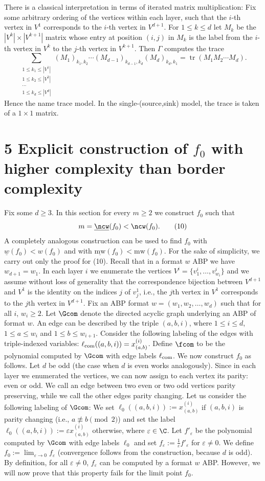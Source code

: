 There is a classical interpretation in terms of iterated matrix multiplication: Fix some arbitrary ordering of the vertices within each layer, such that the $i$-th vertex in $V^1$ corresponds to the $i$-th vertex in $V^{d+1}$. For $1\le k\le d$ let $M_k$ be the $|V^k|\times|V^{k+1}|$ matrix whose entry at position $(i,j)$ in $M_k$ is the label from the $i$-th vertex in $V^k$ to the $j$-th vertex in $V^{k+1}$. Then $\Gamma$ computes the trace
\[\sum_{\substack{1\le k_1\le|V^1|\\1\le k_2\le|V^2|\\\cdots\\1\le k_d\le|V^d|}}(M_1)_{k_1,k_2}\cdots(M_{d-1})_{k_{d-1},k_d}(M_d)_{k_d,k_1}=\operatorname{tr}(M_1M_2\cdots M_d).\tag{8}\]
Hence the name trace model. In the single-(source,sink) model, the trace is taken of a $1\times1$ matrix.
\section*{5 Explicit construction of $f_0$ with higher complexity than border complexity}
Fix some $d\ge3$. In this section for every $m\ge2$ we construct $f_0$ such that
\[m=\underline{\ncw}(f_0)<\ncw(f_0).\tag{10}\]
A completely analogous construction can be used to find $f_0$ with $\underline w(f_0)<w(f_0)$ and with $\underline{\mathrm{mw}}(f_0)<\mathrm{mw}(f_0)$. For the sake of simplicity, we carry out only the proof for (10).
Recall that in a format $w$ ABP we have $w_{d+1}=w_1$. In each layer $i$ we enumerate the vertices $V^i=\{v^i_1,\ldots,v^i_{w_i}\}$ and we assume without loss of generality that the correspondence bijection between $V^{d+1}$ and $V^1$ is the identity on the indices $j$ of $v^1_j$, i.e., the $j$th vertex in $V^1$ corresponds to the $j$th vertex in $V^{d+1}$.
Fix an ABP format $w=(w_1,w_2,\ldots,w_d)$ such that for all $i$, $w_i\ge2$. Let $\Gcom$ denote the directed acyclic graph underlying an ABP of format $w$. An edge can be described by the triple $(a,b,i)$, where $1\le i\le d$, $1\le a\le w_i$ and $1\le b\le w_{i+1}$. Consider the following labeling of the edges with triple-indexed variables: $\ell_{\rm com}((a,b,i))=x^{(i)}_{(a,b)}$. Define $\fcom$ to be the polynomial computed by $\Gcom$ with edge labels $\ell_{\rm com}$.
We now construct $f_0$ as follows. Let $d$ be odd (the case when $d$ is even works analogously). Since in each layer we enumerated the vertices, we can now assign to each vertex its parity: even or odd. We call an edge between two even or two odd vertices parity preserving, while we call the other edges parity changing. Let us consider the following labeling of $\Gcom$: We set $\ell_0((a,b,i)):=x^{(i)}_{(a,b)}$ if $(a,b,i)$ is parity changing (i.e., $a\not\equiv b\pmod2$) and set the label $\ell_0((a,b,i)):=\varepsilon x^{(i)}_{(a,b)}$ otherwise, where $\varepsilon\in\C$. Let $f'_\varepsilon$ be the polynomial computed by $\Gcom$ with edge labels $\ell_0$ and set $f_\varepsilon:=\frac1\varepsilon f'_\varepsilon$ for $\varepsilon\ne0$. We define $f_0:=\lim_{\varepsilon\to0}f_\varepsilon$ (convergence follows from the construction, because $d$ is odd). By definition, for all $\varepsilon\ne0$, $f_\varepsilon$ can be computed by a format $w$ ABP. However, we will now prove that this property fails for the limit point $f_0$.
